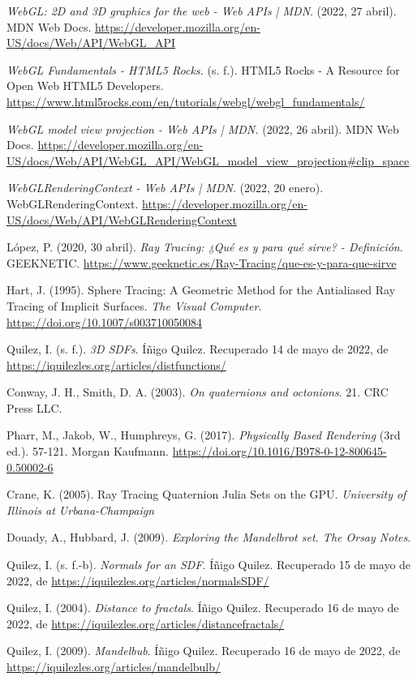 \begin{thebibliography}{99}
 \textit{WebGL: 2D and 3D graphics for the web - Web APIs | MDN}. (2022, 27 abril). MDN Web Docs. \url{https://developer.mozilla.org/en-US/docs/Web/API/WebGL_API}

 \textit{WebGL Fundamentals - HTML5 Rocks.} (s. f.). HTML5 Rocks - A Resource for Open Web HTML5 Developers. \url{https://www.html5rocks.com/en/tutorials/webgl/webgl_fundamentals/}

 \textit{WebGL model view projection - Web APIs | MDN.} (2022, 26 abril). MDN Web Docs. \url{https://developer.mozilla.org/en-US/docs/Web/API/WebGL_API/WebGL_model_view_projection#clip_space}

 \textit{WebGLRenderingContext - Web APIs | MDN}. (2022, 20 enero). WebGLRenderingContext. \url{https://developer.mozilla.org/en-US/docs/Web/API/WebGLRenderingContext}

 López, P. (2020, 30 abril). \textit{Ray Tracing: ¿Qué es y para qué sirve? - Definición}. GEEKNETIC. \url{https://www.geeknetic.es/Ray-Tracing/que-es-y-para-que-sirve}

 Hart, J. (1995). Sphere Tracing: A Geometric Method for the Antialiased Ray Tracing of Implicit Surfaces. \textit{The Visual Computer}. \url{https://doi.org/10.1007/s003710050084}

 Quilez, I. (s. f.). \textit{3D SDFs}. Íñigo Quilez. Recuperado 14 de mayo de 2022, de \url{https://iquilezles.org/articles/distfunctions/}

 Conway, J. H., Smith, D. A. (2003). \textit{On quaternions and octonions}. 21. CRC Press LLC.

 Pharr, M., Jakob, W., Humphreys, G. (2017). \textit{Physically Based Rendering} (3rd ed.). 57-121. Morgan Kaufmann. \url{https://doi.org/10.1016/B978-0-12-800645-0.50002-6} 

 Crane, K. (2005). Ray Tracing Quaternion Julia Sets on the GPU. \textit{University of Illinois at Urbana-Champaign}

 Douady, A., Hubbard, J. (2009). \textit{Exploring the Mandelbrot set. The Orsay Notes}.

 Quilez, I. (s. f.-b). \textit{Normals for an SDF}. Íñigo Quilez. Recuperado 15 de mayo de 2022, de \url{https://iquilezles.org/articles/normalsSDF/}

 Quilez, I. (2004). \textit{Distance to fractals}. Íñigo Quilez. Recuperado 16 de mayo de 2022, de \url{https://iquilezles.org/articles/distancefractals/}

 Quilez, I. (2009). \textit{Mandelbub}. Íñigo Quilez. Recuperado 16 de mayo de 2022, de \url{https://iquilezles.org/articles/mandelbulb/}
\end{thebibliography}

